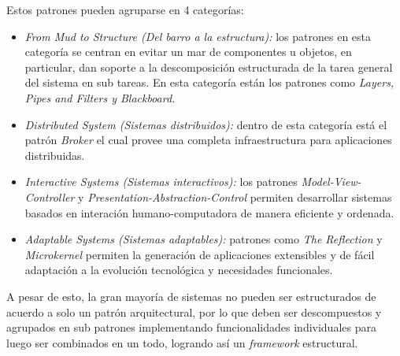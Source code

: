 Estos patrones pueden agruparse en 4 categor\'ias:
\begin{itemize}
	\item \textit{From Mud to Structure (Del barro a la estructura):} los patrones en esta categor\'ia se centran en evitar un mar de componentes u objetos, en particular, dan soporte a la descomposici\'on estructurada de la tarea general del sistema en sub tareas. En esta categor\'ia est\'an los patrones como \textit{Layers, Pipes and Filters y Blackboard.}
	
	\item \textit{Distributed System (Sistemas distribuidos):} dentro de esta categor\'ia est\'a el patr\'on \textit{Broker} el cual provee una completa infraestructura para aplicaciones distribuidas.
	
	\item \textit{Interactive Systems (Sistemas interactivos):} los patrones \textit{Model-View-Controller} y \textit{Presentation-Abstraction-Control} permiten desarrollar sistemas basados en interaci\'on humano-computadora de manera eficiente y ordenada.
	
	\item \textit{Adaptable Systems (Sistemas adaptables):} patrones como \textit{The Reflection} y \textit{Microkernel} permiten la generaci\'on de aplicaciones extensibles y de f\'acil adaptaci\'on a la evoluci\'on tecnol\'ogica y necesidades funcionales.
\end{itemize}
A pesar de esto, la gran mayor\'ia de sistemas no pueden ser estructurados de acuerdo a solo un patr\'on arquitectural, por lo que deben ser descompuestos y agrupados en sub patrones implementando funcionalidades individuales para luego ser combinados en un todo, logrando as\'i un \textit{framework} estructural.
\newpage
